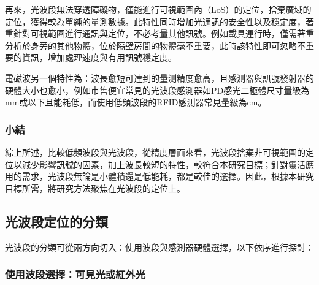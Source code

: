         
        
        再來，光波段無法穿透障礙物，僅能進行可視範圍內（LoS）的定位，捨棄廣域的定位，獲得較為單純的量測數據。此特性同時增加光通訊的安全性以及穩定度，著重針對可視範圍進行通訊與定位，不必考量其他訊號。例如載具運行時，僅需著重分析於身旁的其他物體，位於隔壁房間的物體毫不重要，此時該特性即可忽略不重要的資訊，增加處理速度與有用訊號穩定度。

        

        電磁波另一個特性為：波長愈短可達到的量測精度愈高，且感測器與訊號發射器的硬體大小也愈小，例如市售便宜常見的光波段感測器如PD感光二極體尺寸量級為mm或以下\cite{datasheet:led_sfh4545}且能耗低，而使用低頻波段的RFID感測器常見量級為cm\cite{datasheet:rfid_tag}。


    \subsubsection{小結}

        
        綜上所述，比較低頻波段與光波段，從精度層面來看，光波段捨棄非可視範圍的定位以減少影響訊號的因素，加上波長較短的特性，較符合本研究目標；針對靈活應用的需求，光波段無論是小體積還是低能耗，都是較佳的選擇。因此，根據本研究目標所需，將研究方法聚焦在光波段的定位上。



    \subsection{光波段定位的分類}

        

        光波段的分類可從兩方向切入：使用波段與感測器硬體選擇，以下依序進行探討：

        \subsubsection{使用波段選擇：可見光或紅外光}

